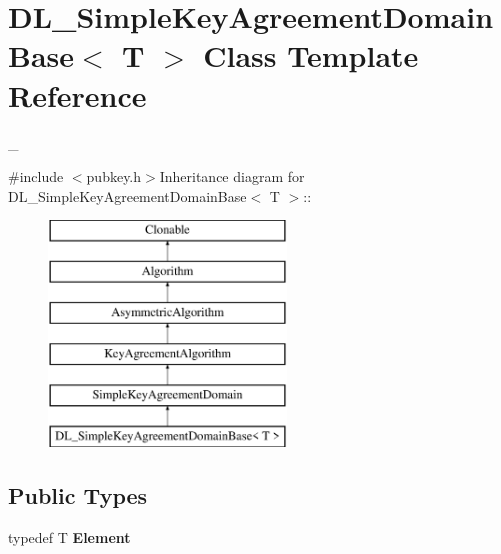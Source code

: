 \hypertarget{class_d_l___simple_key_agreement_domain_base}{
\section{DL\_\-SimpleKeyAgreementDomainBase$<$ T $>$ Class Template Reference}
\label{class_d_l___simple_key_agreement_domain_base}
}


\_\-  


{\ttfamily \#include $<$pubkey.h$>$}Inheritance diagram for DL\_\-SimpleKeyAgreementDomainBase$<$ T $>$::\begin{figure}[H]
\begin{center}
\leavevmode
\includegraphics[height=6cm]{class_d_l___simple_key_agreement_domain_base}
\end{center}
\end{figure}
\subsection*{Public Types}
\begin{DoxyCompactItemize}
\item 
\hypertarget{class_d_l___simple_key_agreement_domain_base_a62cb814342c9cdcaa44e86c6abf11c4a}{
typedef T {\bfseries Element}}
\label{class_d_l___simple_key_agreement_domain_base_a62cb814342c9cdcaa44e86c6abf11c4a}

\end{DoxyCompactItemize}
